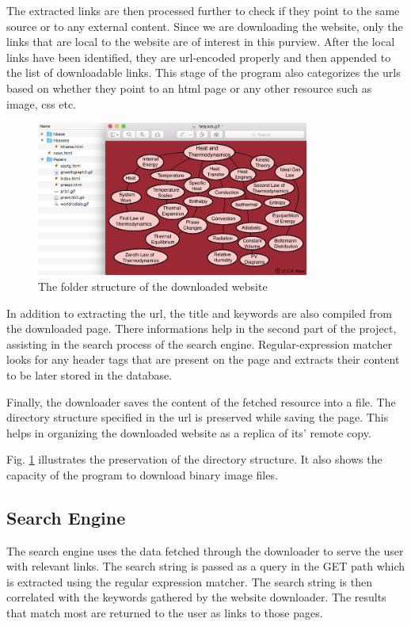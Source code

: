 \documentclass{project_report}
\begin{document}
The extracted links are then processed further to check if they point to the same source or to any external content. Since we are downloading the website, only the links that are local to the website are of interest in this purview. After the local links have been identified, they are url-encoded properly and then appended to the list of downloadable links. This stage of the program also categorizes the urls based on whether they point to an html page or any other resource such as image, css etc.

\begin{figure}[!hbt]
  \centering
  \includegraphics[width=0.8\textwidth]{downloader-sc}
  \caption{The folder structure of the downloaded website}
  \label{downloader-sc}
\end{figure}


In addition to extracting the url, the title and keywords are also compiled from the downloaded page. There informations help in the second part of the project, assisting in the search process of the search engine. Regular-expression matcher looks for any header tags that are present on the page and extracts their content to be later stored in the database.

Finally, the downloader saves the content of the fetched resource into a file. The directory structure specified in the url is preserved while saving the page. This helps in organizing the downloaded website as a replica of its' remote copy.

Fig. \ref{downloader-sc} illustrates the preservation of the directory structure. It also shows the capacity of the program to download binary image files.

\subsection{Search Engine}
The search engine uses the data fetched through the downloader to serve the user with relevant links. The search string is passed as a query in the GET path which is extracted using the regular expression matcher. The search string is then correlated with the keywords gathered by the website downloader. The results that match most are returned to the user as links to those pages.
\end{document}
